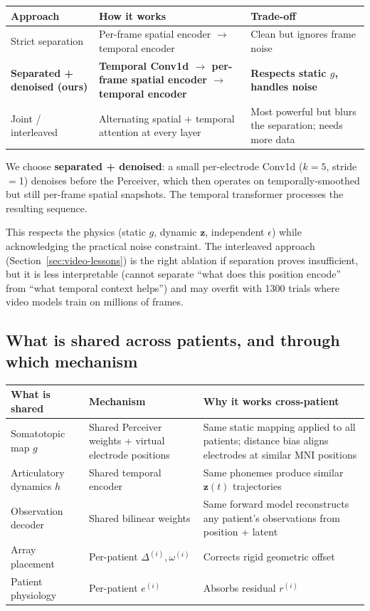\documentclass[11pt,letterpaper]{article}
\newcommand{\bfz}{\mathbf{z}}
\begin{document}
\begin{table}[ht!]\centering\small
\begin{tabular}{@{}p{}p{}p{}@{}}
\toprule
\textbf{Approach} & \textbf{How it works} & \textbf{Trade-off} \\
\midrule
Strict separation & Per-frame spatial encoder $\to$ temporal encoder & Clean but ignores frame noise \\
\textbf{Separated + denoised (ours)} & \textbf{Temporal Conv1d $\to$ per-frame spatial encoder $\to$ temporal encoder} & \textbf{Respects static $g$, handles noise} \\
Joint / interleaved & Alternating spatial + temporal attention at every layer & Most powerful but blurs the separation; needs more data \\
\bottomrule
\end{tabular}
\end{table}

We choose \textbf{separated + denoised}: a small per-electrode Conv1d ($k{=}5$, stride$=$1) denoises before the Perceiver, which then operates on temporally-smoothed but still per-frame spatial snapshots. The temporal transformer processes the resulting sequence.

This respects the physics (static $g$, dynamic $\bfz$, independent $\epsilon$) while acknowledging the practical noise constraint. The interleaved approach (Section~\ref{sec:video-lessons}) is the right ablation if separation proves insufficient, but it is less interpretable (cannot separate ``what does this position encode'' from ``what temporal context helps'') and may overfit with 1300 trials where video models train on millions of frames.

\subsection{What is shared across patients, and through which mechanism}

\begin{table}[ht!]\centering\small
\begin{tabular}{@{}p{}p{}p{}@{}}
\toprule
\textbf{What is shared} & \textbf{Mechanism} & \textbf{Why it works cross-patient} \\
\midrule
Somatotopic map $g$ & Shared Perceiver weights + virtual electrode positions & Same static mapping applied to all patients; distance bias aligns electrodes at similar MNI positions \\
Articulatory dynamics $h$ & Shared temporal encoder & Same phonemes produce similar $\bfz(t)$ trajectories \\
Observation decoder & Shared bilinear weights & Same forward model reconstructs any patient's observations from position + latent \\
\midrule
Array placement & Per-patient $\Delta^{(i)}, \omega^{(i)}$ & Corrects rigid geometric offset \\
Patient physiology & Per-patient $e^{(i)}$ & Absorbs residual $r^{(i)}$ \\
\bottomrule
\end{tabular}
\end{table}
\end{document}
